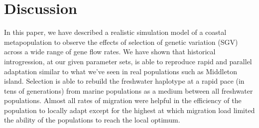 \documentclass{article}
\begin{document}

\section*{Discussion}
 
In this paper, we have described a realistic simulation model of a coastal metapopulation to observe the effects of selection of genetic variation (SGV) across a wide range of gene flow rates.
We have shown that historical introgression, at our given parameter sets, is able to reproduce rapid and parallel adaptation similar to what we've seen in real populations such as Middleton island. 
Selection is able to rebuild the freshwater haplotype at a rapid pace (in tens of generations) from marine populations as a medium between all freshwater populations. 
Almost all rates of migration were helpful in the efficiency of the population to locally adapt except for the highest at which migration load limited the ability of the populations to reach the local optimum. 
\end{document}
